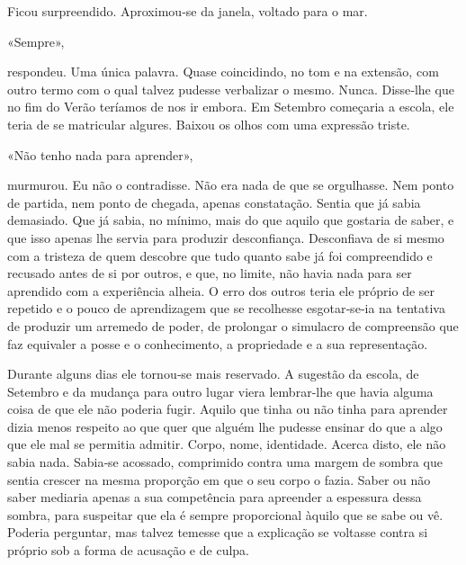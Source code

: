 Ficou surpreendido. Aproximou­‑se da janela, voltado para o mar.

«Sempre»,

respondeu. Uma única palavra. Quase coincidindo, no tom e na extensão,
com outro termo com o qual talvez pudesse verbalizar o mesmo. Nunca.
Disse­‑lhe que no fim do Verão teríamos de nos ir embora. Em Setembro
começaria a escola, ele teria de se matricular algures. Baixou os olhos
com uma expressão triste.

«Não tenho nada para aprender»,

murmurou. Eu não o contradisse. Não era nada de que se orgulhasse. Nem
ponto de partida, nem ponto de chegada, apenas constatação. Sentia que
já sabia demasiado. Que já sabia, no mínimo, mais do que aquilo que
gostaria de saber, e que isso apenas lhe servia para produzir
desconfiança. Desconfiava de si mesmo com a tristeza de quem descobre
que tudo quanto sabe já foi compreendido e recusado antes de si por
outros, e que, no limite, não havia nada para ser aprendido com a
experiência alheia. O erro dos outros teria ele próprio de ser repetido
e o pouco de aprendizagem que se recolhesse esgotar­‑se­‑ia na tentativa
de produzir um arremedo de poder, de prolongar o simulacro de
compreensão que faz equivaler a posse e o conhecimento, a propriedade e
a sua representação.

Durante alguns dias ele tornou­‑se mais reservado. A sugestão da escola,
de Setembro e da mudança para outro lugar viera lembrar­‑lhe que havia
alguma coisa de que ele não poderia fugir. Aquilo que tinha ou não tinha
para aprender dizia menos respeito ao que quer que alguém lhe pudesse
ensinar do que a algo que ele mal se permitia admitir. Corpo, nome,
identidade. Acerca disto, ele não sabia nada. Sabia­‑se acossado,
comprimido contra uma margem de sombra que sentia crescer na mesma
proporção em que o seu corpo o fazia. Saber ou não saber mediaria apenas
a sua competência para apreender a espessura dessa sombra, para
suspeitar que ela é sempre proporcional àquilo que se sabe ou vê.
Poderia perguntar, mas talvez temesse que a explicação se voltasse
contra si próprio sob a forma de acusação e de culpa.

